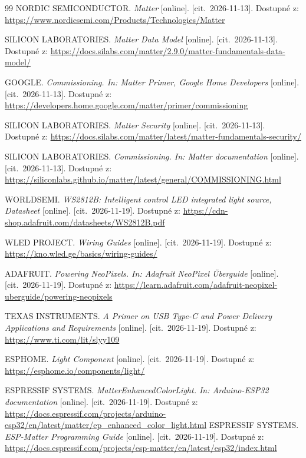 \begin{thebibliography}{99}
NORDIC SEMICONDUCTOR. \emph{Matter}
[online]. [cit.~2026-11-13].
Dostupné z: \url{https://www.nordicsemi.com/Products/Technologies/Matter}

SILICON LABORATORIES. \emph{Matter Data Model}
[online]. [cit.~2026-11-13].
Dostupné z: \url{https://docs.silabs.com/matter/2.9.0/matter-fundamentals-data-model/}

GOOGLE. \emph{Commissioning. In: Matter Primer, Google Home Developers}
[online]. [cit.~2026-11-13].
Dostupné z: \url{https://developers.home.google.com/matter/primer/commissioning}

SILICON LABORATORIES. \emph{Matter Security}
[online]. [cit.~2026-11-13].
Dostupné z: \url{https://docs.silabs.com/matter/latest/matter-fundamentals-security/}

SILICON LABORATORIES. \emph{Commissioning. In: Matter documentation}
[online]. [cit.~2026-11-13].
Dostupné z: \url{https://siliconlabs.github.io/matter/latest/general/COMMISSIONING.html}

WORLDSEMI. \emph{WS2812B: Intelligent control LED integrated light source, Datasheet}
[online]. [cit.~2026-11-19].
Dostupné z: \url{https://cdn-shop.adafruit.com/datasheets/WS2812B.pdf}

WLED PROJECT. \emph{Wiring Guides}
[online]. [cit.~2026-11-19].
Dostupné z: \url{https://kno.wled.ge/basics/wiring-guides/}

ADAFRUIT. \emph{Powering NeoPixels. In: Adafruit NeoPixel Überguide}
[online]. [cit.~2026-11-19].
Dostupné z: \url{https://learn.adafruit.com/adafruit-neopixel-uberguide/powering-neopixels}

TEXAS INSTRUMENTS. \emph{A Primer on USB Type-C and Power Delivery Applications and Requirements}
[online]. [cit.~2026-11-19].
Dostupné z: \url{https://www.ti.com/lit/slyy109}

ESPHOME. \emph{Light Component}
[online]. [cit.~2026-11-19].
Dostupné z: \url{https://esphome.io/components/light/}

ESPRESSIF SYSTEMS. \emph{MatterEnhancedColorLight. In: Arduino-ESP32 documentation}
[online]. [cit.~2026-11-19].
Dostupné z: \url{https://docs.espressif.com/projects/arduino-esp32/en/latest/matter/ep_enhanced_color_light.html}
ESPRESSIF SYSTEMS. \emph{ESP-Matter Programming Guide}
[online]. [cit.~2026-11-19].
Dostupné z: \url{https://docs.espressif.com/projects/esp-matter/en/latest/esp32/index.html}


\end{thebibliography}
